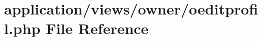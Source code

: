 \hypertarget{oeditprofil_8php}{}\section{application/views/owner/oeditprofil.php File Reference}
\label{oeditprofil_8php}
